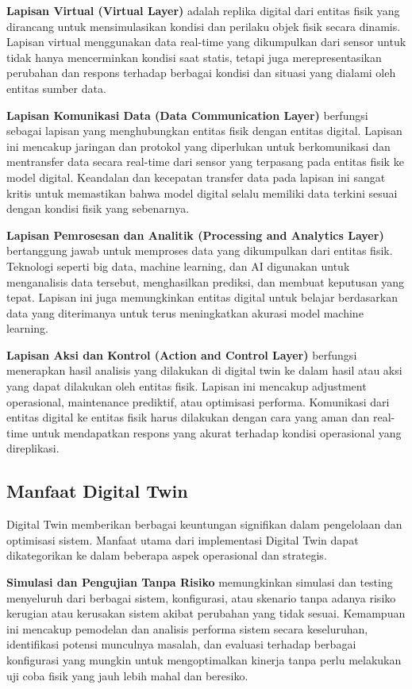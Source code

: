 \textbf{Lapisan Virtual (Virtual Layer)} adalah replika digital dari entitas fisik yang dirancang untuk mensimulasikan kondisi dan perilaku objek fisik secara dinamis. Lapisan virtual menggunakan data real-time yang dikumpulkan dari sensor untuk tidak hanya mencerminkan kondisi saat statis, tetapi juga merepresentasikan perubahan dan respons terhadap berbagai kondisi dan situasi yang dialami oleh entitas sumber data.

\textbf{Lapisan Komunikasi Data (Data Communication Layer)} berfungsi sebagai lapisan yang menghubungkan entitas fisik dengan entitas digital. Lapisan ini mencakup jaringan dan protokol yang diperlukan untuk berkomunikasi dan mentransfer data secara real-time dari sensor yang terpasang pada entitas fisik ke model digital. Keandalan dan kecepatan transfer data pada lapisan ini sangat kritis untuk memastikan bahwa model digital selalu memiliki data terkini sesuai dengan kondisi fisik yang sebenarnya.

\textbf{Lapisan Pemrosesan dan Analitik (Processing and Analytics Layer)} bertanggung jawab untuk memproses data yang dikumpulkan dari entitas fisik. Teknologi seperti big data, machine learning, dan AI digunakan untuk menganalisis data tersebut, menghasilkan prediksi, dan membuat keputusan yang tepat. Lapisan ini juga memungkinkan entitas digital untuk belajar berdasarkan data yang diterimanya untuk terus meningkatkan akurasi model machine learning.

\textbf{Lapisan Aksi dan Kontrol (Action and Control Layer)} berfungsi menerapkan hasil analisis yang dilakukan di digital twin ke dalam hasil atau aksi yang dapat dilakukan oleh entitas fisik. Lapisan ini mencakup adjustment operasional, maintenance prediktif, atau optimisasi performa. Komunikasi dari entitas digital ke entitas fisik harus dilakukan dengan cara yang aman dan real-time untuk mendapatkan respons yang akurat terhadap kondisi operasional yang direplikasi.

\subsection{Manfaat Digital Twin}

Digital Twin memberikan berbagai keuntungan signifikan dalam pengelolaan dan optimisasi sistem. Manfaat utama dari implementasi Digital Twin dapat dikategorikan ke dalam beberapa aspek operasional dan strategis.

\textbf{Simulasi dan Pengujian Tanpa Risiko} memungkinkan simulasi dan testing menyeluruh dari berbagai sistem, konfigurasi, atau skenario tanpa adanya risiko kerugian atau kerusakan sistem akibat perubahan yang tidak sesuai. Kemampuan ini mencakup pemodelan dan analisis performa sistem secara keseluruhan, identifikasi potensi munculnya masalah, dan evaluasi terhadap berbagai konfigurasi yang mungkin untuk mengoptimalkan kinerja tanpa perlu melakukan uji coba fisik yang jauh lebih mahal dan beresiko.

